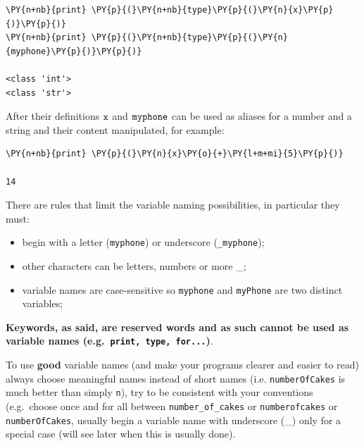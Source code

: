 \begin{tcolorbox}[breakable, size=fbox, boxrule=1pt, pad at break*=1mm, colback=cellbackground, colframe=cellborder]
\begin{Verbatim}[commandchars=\\\{\}]
\PY{n+nb}{print} \PY{p}{(}\PY{n+nb}{type}\PY{p}{(}\PY{n}{x}\PY{p}{)}\PY{p}{)}
\PY{n+nb}{print} \PY{p}{(}\PY{n+nb}{type}\PY{p}{(}\PY{n}{myphone}\PY{p}{)}\PY{p}{)}

<class 'int'>
<class 'str'>
\end{Verbatim}
\end{tcolorbox}

After their definitions \(\tt{x}\) and \(\tt{myphone}\) can be used as aliases for a number and a string and their content manipulated, for example:

\begin{tcolorbox}[breakable, size=fbox, boxrule=1pt, pad at break*=1mm, colback=cellbackground, colframe=cellborder]
\begin{Verbatim}[commandchars=\\\{\}]
\PY{n+nb}{print} \PY{p}{(}\PY{n}{x}\PY{o}{+}\PY{l+m+mi}{5}\PY{p}{)}

14
\end{Verbatim}
\end{tcolorbox}

There are rules that limit the variable naming possibilities, in particular they must:
\begin{itemize}
\item begin with a letter (\texttt{myphone}) or underscore (\texttt{\_myphone});
\item other characters can be letters, numbers or more \_;
\item variable names are case-sensitive so \texttt{myphone} and \texttt{myPhone} are two distinct variables;
\end{itemize}

\textbf{Keywords, as said, are reserved words and as such cannot be used as variable names (e.g.~\texttt{print, type, for...})}.

To use \textbf{good} variable names (and make your programs clearer and easier to read) always choose meaningful names instead of short names (i.e. \texttt{numberOfCakes} is much better than simply \texttt{n}), try to be consistent with your conventions (e.g.~choose once and for all between \texttt{number\_of\_cakes} or \texttt{numberofcakes} or \texttt{numberOfCakes}, usually begin a variable name with underscore (\_) only for a special case (will see later when this is usually done).

